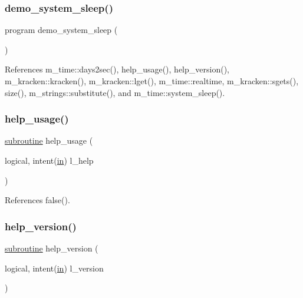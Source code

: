 \subsubsection{\texorpdfstring{demo\+\_\+system\+\_\+sleep()}{demo\_system\_sleep()}}
{\footnotesize\ttfamily program demo\+\_\+system\+\_\+sleep (\begin{DoxyParamCaption}{ }\end{DoxyParamCaption})}



References m\+\_\+time\+::days2sec(), help\+\_\+usage(), help\+\_\+version(), m\+\_\+kracken\+::kracken(), m\+\_\+kracken\+::lget(), m\+\_\+time\+::realtime, m\+\_\+kracken\+::sgets(), size(), m\+\_\+strings\+::substitute(), and m\+\_\+time\+::system\+\_\+sleep().

\mbox{\label{__sleep_8f90_a3e09a3b52ee8fb04eeb93fe5761626a8}} 
\subsubsection{\texorpdfstring{help\+\_\+usage()}{help\_usage()}}
{\footnotesize\ttfamily \hyperlink{M__stopwatch_83_8txt_acfbcff50169d691ff02d4a123ed70482}{subroutine} help\+\_\+usage (\begin{DoxyParamCaption}\item[{logical, intent(\hyperlink{M__journal_83_8txt_afce72651d1eed785a2132bee863b2f38}{in})}]{l\+\_\+help }\end{DoxyParamCaption})}



References false().

\mbox{\label{__sleep_8f90_a39c21619b08a3c22f19e2306efd7f766}} 
\subsubsection{\texorpdfstring{help\+\_\+version()}{help\_version()}}
{\footnotesize\ttfamily \hyperlink{M__stopwatch_83_8txt_acfbcff50169d691ff02d4a123ed70482}{subroutine} help\+\_\+version (\begin{DoxyParamCaption}\item[{logical, intent(\hyperlink{M__journal_83_8txt_afce72651d1eed785a2132bee863b2f38}{in})}]{l\+\_\+version }\end{DoxyParamCaption})}



